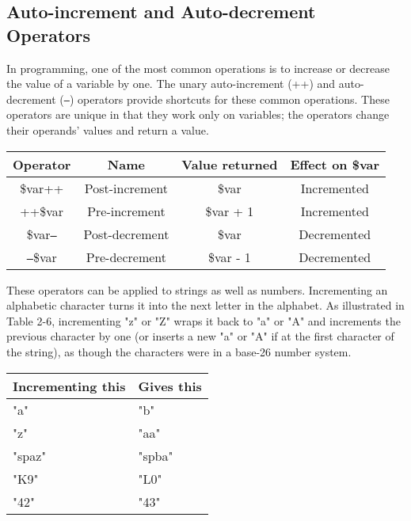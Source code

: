 \documentclass{report}
\begin{document}
\subsection{Auto-increment and Auto-decrement Operators}
\bigbreak \noindent 
In programming, one of the most common operations is to increase or decrease the
value of a variable by one. The unary auto-increment (++) and auto-decrement (\texttt{--})
operators provide shortcuts for these common operations. These operators are unique
in that they work only on variables; the operators change their operands’ values and
return a value.
\bigbreak \noindent 
\begin{center}
    \begin{tabular}{c|c|c|c}
        Operator &Name &Value returned &Effect on \$var \\
        \hline
        \$var++ &Post-increment &\$var &Incremented \\
        ++\$var &Pre-increment &\$var + 1 &Incremented \\
        \$var\texttt{--} &Post-decrement &\$var &Decremented \\
        \texttt{--}\$var &Pre-decrement &\$var - 1 &Decremented 
    \end{tabular}
\end{center}
\bigbreak \noindent 
These operators can be applied to strings as well as numbers. Incrementing an alphabetic character turns it into the next letter in the alphabet. As illustrated in Table 2-6,
incrementing "z" or "Z" wraps it back to "a" or "A" and increments the previous character by one (or inserts a new "a" or "A" if at the first character of the string), as though
the characters were in a base-26 number system.
\bigbreak \noindent 
\begin{center}
    \begin{tabular}{p{4cm}|p{4cm}}
        Incrementing this &Gives this \\
        \hline
        "a" &"b" \\
        "z" &"aa" \\
        "spaz" &"spba" \\
        "K9"& "L0" \\
        "42" &"43"
    \end{tabular}
\end{center}

\bigbreak \noindent 
\end{document}

